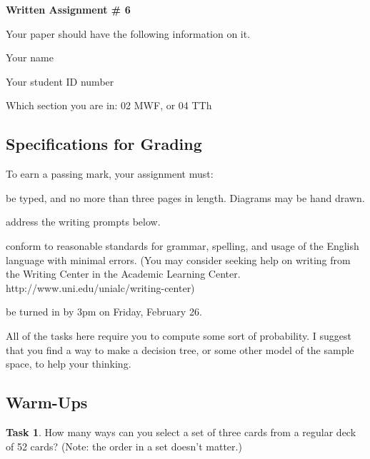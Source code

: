 \documentclass[12pt,letterpaper]{article}
\theoremstyle{definition}
\newtheorem{task}{Task}
\begin{document}
\setlength{\parskip}{1ex plus 0.5ex minus 0.2ex}
\setlength{\parindent}{0pt}

\pagestyle{fancy}
\lfoot{}
\rfoot{}

\begin{center}
{
\Large
\textbf{Written Assignment \# 6}
}
\end{center}

Your paper should have the following information on it.
\begin{compactitem}
\item Your name
\item Your student ID number 
\item Which section you are in: 02 MWF, or 04 TTh
\end{compactitem}


\subsection*{Specifications for Grading}

To earn a passing mark, your assignment must:
\begin{compactitem}
\item be typed, and no more than three pages in length. Diagrams may be hand drawn.
\item address the writing prompts below.
\item conform to reasonable standards for grammar, spelling, and usage of the English language with minimal errors. (You may consider seeking help on writing from the Writing Center in the Academic Learning Center. http://www.uni.edu/unialc/writing-center)
\item be turned in by 3pm on Friday, February 26.
\end{compactitem}

All of the tasks here require you to compute some sort of probability. I suggest that you find a way to make a decision tree, or some other model of the sample space, to help your thinking.

\subsection*{Warm-Ups}

\begin{task}How many ways can you select a set of three cards from a regular deck of 52 cards? (Note: the order in a set doesn't matter.)
\end{task}
\end{document}
